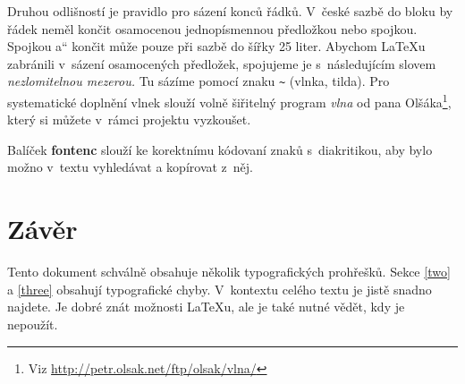 \documentclass[10pt, a4paper, twocolumn]{article}
\newcommand{\myuv}[1]{\quotedblbase #1\textquotedblleft}
\begin{document}
        Druhou odlišností je pravidlo pro sázení konců řádků.
        V~české sazbě do bloku by řádek neměl končit osamocenou jednopísmennou předložkou nebo spojkou.
        Spojkou \myuv{a} končit může pouze při sazbě do šířky 25 liter.
        Abychom \LaTeX u zabránili v~sázení osamocených předložek, spojujeme je s~následujícím slovem \emph{nezlomitelnou mezerou.}
        Tu sázíme pomocí znaku \verb|~| (vlnka, tilda).
        Pro systematické doplnění vlnek slouží volně šiřitelný program \emph{vlna} od pana Olšáka\footnote[2]{Viz \href{http://petr.olsak.net/ftp/olsak/vlna/}{http://petr.olsak.net/ftp/olsak/vlna/}}, který si můžete v~rámci projektu vyzkoušet.

        Balíček \textbf{fontenc} slouží ke korektnímu kódovaní znaků s~diakritikou, aby bylo možno v~textu vyhledávat a kopírovat z~něj.


    \section{Závěr}

        Tento dokument schválně obsahuje několik typografických prohřešků.
        Sekce \ref{two} a \ref{three} obsahují typografické chyby.
        V~kontextu celého textu je jistě snadno najdete.
        Je dobré znát možnosti \LaTeX u, ale je také nutné vědět, kdy je nepoužít.
\end{document}
